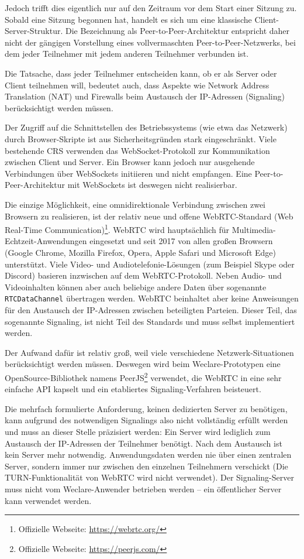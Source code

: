 Jedoch trifft dies eigentlich nur auf den Zeitraum vor dem Start einer Sitzung zu. Sobald eine Sitzung begonnen hat, handelt es sich um eine klassische Client-Server-Struktur. Die Bezeichnung als Peer-to-Peer-Architektur entspricht daher nicht der gängigen Vorstellung eines vollvermaschten Peer-to-Peer-Netzwerks, bei dem jeder Teilnehmer mit jedem anderen Teilnehmer verbunden ist.

Die Tatsache, dass jeder Teilnehmer entscheiden kann, ob er als Server oder Client teilnehmen will, bedeutet auch, dass Aspekte wie Network Address Translation (NAT) und Firewalls beim Austausch der IP-Adressen (Signaling) berücksichtigt werden müssen.

Der Zugriff auf die Schnittstellen des Betriebssystems (wie etwa das Netzwerk) durch Browser-Skripte ist aus Sicherheitsgründen stark eingeschränkt. Viele bestehende CRS verwenden das WebSocket-Protokoll zur Kommunikation zwischen Client und Server. Ein Browser kann jedoch nur ausgehende Verbindungen über WebSockets initiieren und nicht empfangen. Eine Peer-to-Peer-Architektur mit WebSockets ist deswegen nicht realisierbar.

Die einzige Möglichkeit, eine omnidirektionale Verbindung zwischen zwei Browsern zu realisieren, ist der relativ neue und offene WebRTC-Standard (Web Real-Time Communication)\footnote{Offizielle Webseite: \url{https://webrtc.org/}}. WebRTC wird hauptsächlich für Multimedia-Echtzeit-Anwendungen eingesetzt und seit 2017 von allen großen Browsern (Google Chrome, Mozilla Firefox, Opera, Apple Safari und Microsoft Edge) unterstützt. Viele Video- und Audiotelefonie-Lösungen (zum Beispiel Skype oder Discord) basieren inzwischen auf dem WebRTC-Protokoll. Neben Audio- und Videoinhalten können aber auch beliebige andere Daten über sogenannte \texttt{RTCDataChannel} übertragen werden. WebRTC beinhaltet aber keine Anweisungen für den Austausch der IP-Adressen zwischen beteiligten Parteien. Dieser Teil, das sogenannte Signaling, ist nicht Teil des Standards und muss selbst implementiert werden.

Der Aufwand dafür ist relativ groß, weil viele verschiedene Netzwerk-Situationen berücksichtigt werden müssen. Deswegen wird beim Weclare-Prototypen eine OpenSource-Bibliothek namens PeerJS\footnote{Offizielle Webseite: \url{https://peerjs.com/}} verwendet, die WebRTC in eine sehr einfache API kapselt und ein etabliertes Signaling-Verfahren beisteuert.

Die mehrfach formulierte Anforderung, keinen dedizierten Server zu benötigen, kann aufgrund des notwendigen Signalings also nicht vollständig erfüllt werden und muss an dieser Stelle präzisiert werden: Ein Server wird lediglich zum Austausch der IP-Adressen der Teilnehmer benötigt. Nach dem Austausch ist kein Server mehr notwendig. Anwendungsdaten werden nie über einen zentralen Server, sondern immer nur zwischen den einzelnen Teilnehmern verschickt (Die TURN-Funktionalität von WebRTC wird nicht verwendet). Der Signaling-Server muss nicht vom Weclare-Anwender betrieben werden – ein öffentlicher Server kann verwendet werden.

